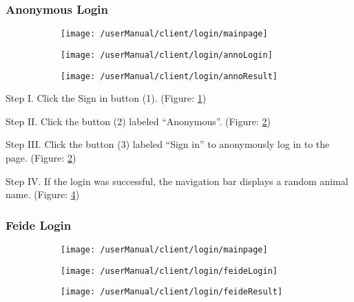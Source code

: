 \subsubsection{Anonymous Login}
\begin{figure}[H]
    \centering
    \begin{subfigure}{0.60\linewidth}
        \texttt{[image: /userManual/client/login/mainpage]}
       	\caption{}
		\label{fig:annoMainPage}	
    \end{subfigure}
    \begin{subfigure}{0.60\linewidth}
        \texttt{[image: /userManual/client/login/annoLogin]}
      	\caption{}
		\label{fig:annoLogin}	
    \end{subfigure}
    \begin{subfigure}{0.60\linewidth}
    	\texttt{[image: /userManual/client/login/annoResult]}
    	\caption{}
    	\label{fig:annoResult}	
    \end{subfigure}
\end{figure}

\begin{userManualItemlist}
	\item[Step I.] Click the Sign in button (1). (Figure: \ref{fig:annoMainPage})
	\item[Step II.] Click the button (2) labeled “Anonymous”. (Figure: \ref{fig:annoLogin})
	\item[Step III.] Click the button (3) labeled “Sign in” to anonymously log in to the page. (Figure: \ref{fig:annoLogin})
	\item[Step IV.] If the login was successful, the navigation bar displays a random animal name. (Figure: \ref{fig:annoResult})
\end{userManualItemlist}

\subsubsection{Feide Login}
\begin{figure}[H]
    \centering
    \begin{subfigure}{0.60\linewidth}
        \texttt{[image: /userManual/client/login/mainpage]}
       	\caption{}
		\label{fig:feideMainPage}	
    \end{subfigure}
    \begin{subfigure}{0.60\linewidth}
        \texttt{[image: /userManual/client/login/feideLogin]}
      	\caption{}
		\label{fig:feideLogin}	
    \end{subfigure}
     \begin{subfigure}{0.60\linewidth}
        \texttt{[image: /userManual/client/login/feideResult]}
      	\caption{}
		\label{fig:feideResult}	
    \end{subfigure}
\end{figure}

